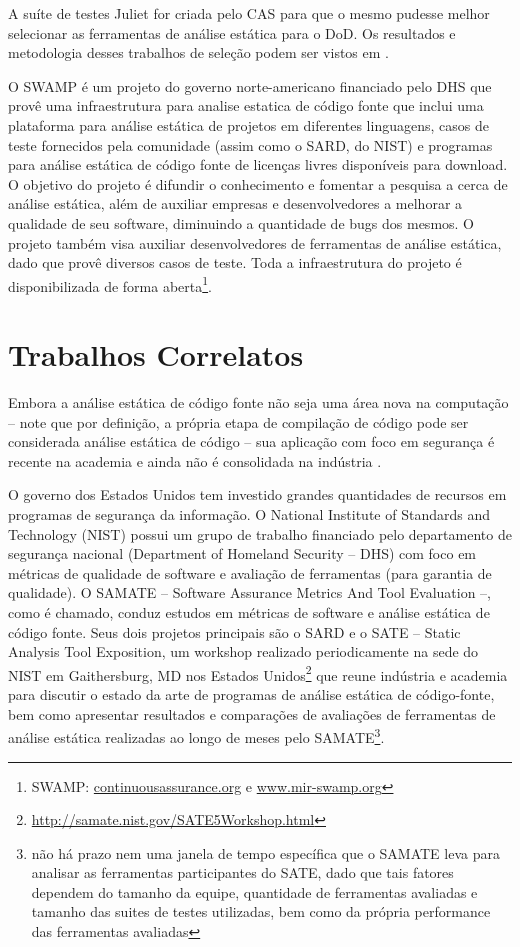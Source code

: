   A suíte de testes Juliet for criada pelo CAS para que o mesmo pudesse melhor selecionar as ferramentas de análise estática para o DoD. Os resultados e metodologia desses trabalhos de seleção podem ser vistos em \cite{nsa}.

  O SWAMP é um projeto do governo norte-americano financiado pelo DHS que provê uma infraestrutura para analise estatica de código fonte que inclui uma plataforma para análise estática de projetos em diferentes linguagens, casos de teste fornecidos pela comunidade (assim como o SARD, do NIST) e programas para análise estática de código fonte de licenças livres disponíveis para download. O objetivo do projeto é difundir o conhecimento e fomentar a pesquisa a cerca de análise estática, além de auxiliar empresas e desenvolvedores a melhorar a qualidade de seu software, diminuindo a quantidade de bugs dos mesmos. O projeto também visa auxiliar desenvolvedores de ferramentas de análise estática, dado que provê diversos casos de teste. Toda a infraestrutura do projeto é disponibilizada de forma aberta\footnote{SWAMP: \url{continuousassurance.org} e \url{www.mir-swamp.org}}.                   

  \section{Trabalhos Correlatos}

  Embora a análise estática de código fonte não seja uma  área nova na computação – note que por definição, a própria etapa de compilação de código pode ser considerada análise estática de código – sua aplicação com foco em segurança é recente na academia e ainda não é consolidada na indústria \cite{johnson2013don}.

  O governo dos Estados Unidos tem investido grandes quantidades de recursos em programas de segurança da informação. O National Institute of Standards and Technology (NIST) possui um grupo de trabalho financiado pelo departamento de segurança nacional (Department of Homeland Security – DHS) com foco em métricas de qualidade de software e avaliação de ferramentas (para garantia de qualidade). O SAMATE – Software Assurance Metrics And Tool Evaluation –, como é chamado, conduz estudos em métricas de software e análise estática de código fonte. Seus dois projetos principais são o SARD e o SATE – Static Analysis Tool Exposition, um workshop realizado periodicamente na sede do NIST em Gaithersburg, MD nos Estados Unidos\footnote{\url{http://samate.nist.gov/SATE5Workshop.html}} que reune indústria e academia para discutir o estado da arte de programas de análise estática de código-fonte, bem como apresentar resultados e comparações de avaliações de ferramentas de análise estática realizadas ao longo de meses pelo SAMATE\footnote{não há prazo nem uma janela de tempo específica que o SAMATE leva para analisar as ferramentas participantes do SATE, dado que tais fatores dependem do tamanho da equipe, quantidade de ferramentas avaliadas e tamanho das suites de testes utilizadas, bem como da própria performance das ferramentas avaliadas}.

